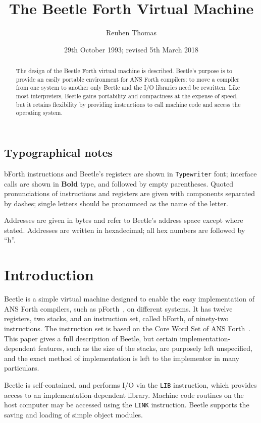 \documentclass[english]{article}
\title{The Beetle Forth Virtual Machine}
\author{Reuben Thomas}
\date{29th October 1993; revised 5th March 2018}
\newlength{\pronunc}\pronunc=1.7in
\begin{document}
\maketitle

\begin{abstract}
\noindent The design of the Beetle Forth virtual machine is described.
Beetle's purpose is to provide an easily portable environment for ANS Forth
compilers: to move a compiler from one system to another only Beetle and the I/O
libraries need be rewritten. Like most interpreters, Beetle gains portability
and compactness at the expense of speed, but it retains flexibility by providing
instructions to call machine code and access the operating system.
\end{abstract}


\subsection*{Typographical notes}

bForth instructions and Beetle's registers are shown in {\tt Typewriter} font;
interface calls are shown in {\bf Bold} type, and followed by empty parentheses.
Quoted pronunciations of instructions and registers are given with components
separated by dashes; single letters should be pronounced as the name of the
letter.

Addresses are given in bytes and refer to Beetle's address space except where
stated. Addresses are written in hexadecimal; all hex numbers are followed by
``h''.


\section{Introduction}

Beetle is a simple virtual machine designed to enable the easy implementation
of ANS Forth compilers, such as pForth~\cite{beetledis}, on different systems.
It has twelve registers, two stacks, and an instruction set, called bForth, of
ninety-two instructions. The instruction set is based on the Core Word Set of
ANS Forth~\cite{ANSIforth}. This paper gives a full description of Beetle, but
certain implementation-dependent features, such as the size of the stacks, are
purposely left unspecified, and the exact method of implementation is left to
the implementor in many particulars.

Beetle is self-contained, and performs I/O via the {\tt LIB} instruction, which
provides access to an implementation-dependent library. Machine
code routines on the host computer may be accessed using the {\tt LINK}
instruction. Beetle supports the saving and loading of simple object modules.
\end{document}
